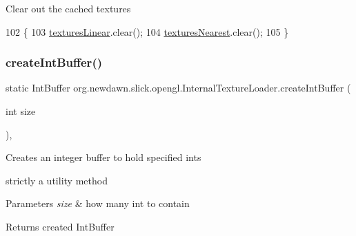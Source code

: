 Clear out the cached textures 
\begin{DoxyCode}
102                         \{
103         \mbox{\hyperlink{classorg_1_1newdawn_1_1slick_1_1opengl_1_1_internal_texture_loader_af5ded371f9b982d890be25766fb2ba46}{texturesLinear}}.clear();
104         \mbox{\hyperlink{classorg_1_1newdawn_1_1slick_1_1opengl_1_1_internal_texture_loader_a2212ea841053c4380293000579d0a068}{texturesNearest}}.clear();
105     \}
\end{DoxyCode}
\mbox{\label{classorg_1_1newdawn_1_1slick_1_1opengl_1_1_internal_texture_loader_a395abad35456c2a752fbca089d209981}} 
\subsubsection{\texorpdfstring{create\+Int\+Buffer()}{createIntBuffer()}}
{\footnotesize\ttfamily static Int\+Buffer org.\+newdawn.\+slick.\+opengl.\+Internal\+Texture\+Loader.\+create\+Int\+Buffer (\begin{DoxyParamCaption}\item[{int}]{size }\end{DoxyParamCaption})\hspace{0.3cm}{\ttfamily [inline]}, {\ttfamily [static]}}

Creates an integer buffer to hold specified ints
\begin{DoxyItemize}
\item strictly a utility method
\end{DoxyItemize}


\begin{DoxyParams}{Parameters}
{\em size} & how many int to contain \\
\hline
\end{DoxyParams}
\begin{DoxyReturn}{Returns}
created Int\+Buffer 
\end{DoxyReturn}

